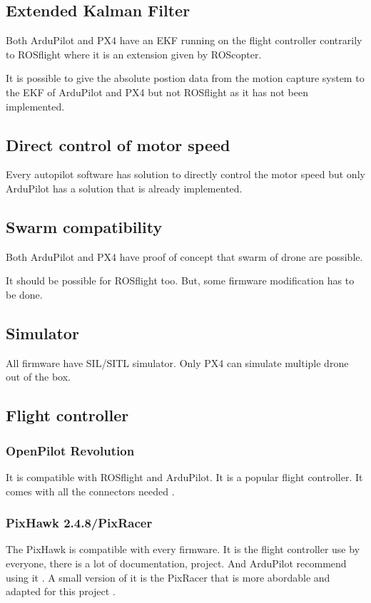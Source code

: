 \subsection{Extended Kalman Filter}
Both ArduPilot and PX4 have an EKF running on the flight controller contrarily to ROSflight where it is an extension given by ROScopter.

It is possible to give the absolute postion data from the motion capture system to the EKF of ArduPilot and PX4 but not ROSflight as it has not been implemented.

\subsection{Direct control of motor speed}
Every autopilot software has solution to directly control the motor speed but only ArduPilot has a solution that is already implemented.

\subsection{Swarm compatibility}
Both ArduPilot \cite{ardupilot_multi_vehicle} and PX4 \cite{px4_multi_vehicle}
have proof of concept that swarm of drone are possible.

It should be possible for ROSflight \cite{github_rosflight_100} too.
But, some firmware modification has to be done.

\subsection{Simulator}
All firmware have SIL/SITL simulator.
Only PX4 can simulate multiple drone out of the box.

\subsection{Flight controller}
\subsubsection{OpenPilot Revolution}
It is compatible with ROSflight and ArduPilot. It is a popular flight controller.
It comes with all the connectors needed \cite{bangood_revo}.


\subsubsection{PixHawk 2.4.8/PixRacer}
The PixHawk is compatible with every firmware.
It is the flight controller use by everyone, there is a lot of documentation, project. And ArduPilot recommend using it \cite{ardupilot_choose_fc}.
A small version of it is the PixRacer that is more abordable and adapted for this project \cite{mrobotics_pixracer}.


